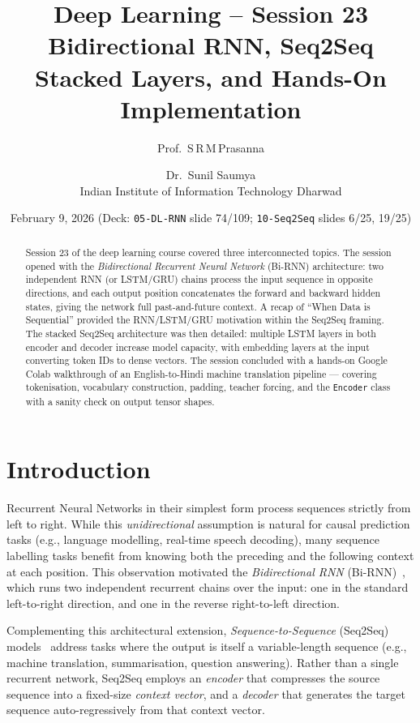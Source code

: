 \documentclass[12pt,a4paper]{article}
\title{\textbf{Deep Learning -- Session 23}\\[0.4em]
       \large Bidirectional RNN, Seq2Seq Stacked Layers, and Hands-On Implementation}
\author{Prof.\ S\,R\,M\,Prasanna \and Dr.\ Sunil Saumya\\[0.3em]
        \normalsize Indian Institute of Information Technology Dharwad}
\date{February 9, 2026 \quad (Deck: \texttt{05-DL-RNN} slide 74/109;
      \texttt{10-Seq2Seq} slides 6/25, 19/25)}
\begin{document}

\maketitle
\thispagestyle{fancy}

\begin{abstract}
Session 23 of the deep learning course covered three interconnected topics.
The session opened with the \emph{Bidirectional Recurrent Neural Network}
(Bi-RNN) architecture: two independent RNN (or LSTM/GRU) chains process the
input sequence in opposite directions, and each output position concatenates
the forward and backward hidden states, giving the network full past-and-future
context.  A recap of ``When Data is Sequential'' provided the RNN/LSTM/GRU
motivation within the Seq2Seq framing.  The stacked Seq2Seq architecture was
then detailed: multiple LSTM layers in both encoder and decoder increase model
capacity, with embedding layers at the input converting token IDs to dense
vectors.  The session concluded with a hands-on Google Colab walkthrough of an
English-to-Hindi machine translation pipeline --- covering tokenisation,
vocabulary construction, padding, teacher forcing, and the \texttt{Encoder}
class with a sanity check on output tensor shapes.
\end{abstract}

\newpage
\tableofcontents
\newpage

\section{Introduction}
\label{sec:introduction}

Recurrent Neural Networks in their simplest form process sequences strictly
from left to right.  While this \emph{unidirectional} assumption is natural for
causal prediction tasks (e.g., language modelling, real-time speech decoding),
many sequence labelling tasks benefit from knowing both the preceding and the
following context at each position.  This observation motivated the
\emph{Bidirectional RNN} (Bi-RNN)~\cite{schuster1997bidirectional}, which runs
two independent recurrent chains over the input: one in the standard
left-to-right direction, and one in the reverse right-to-left direction.

Complementing this architectural extension, \emph{Sequence-to-Sequence} (Seq2Seq)
models~\cite{sutskever2014sequence} address tasks where the output is itself a
variable-length sequence (e.g., machine translation, summarisation, question
answering).  Rather than a single recurrent network, Seq2Seq employs an
\emph{encoder} that compresses the source sequence into a fixed-size
\emph{context vector}, and a \emph{decoder} that generates the target sequence
auto-regressively from that context vector.
\end{document}
